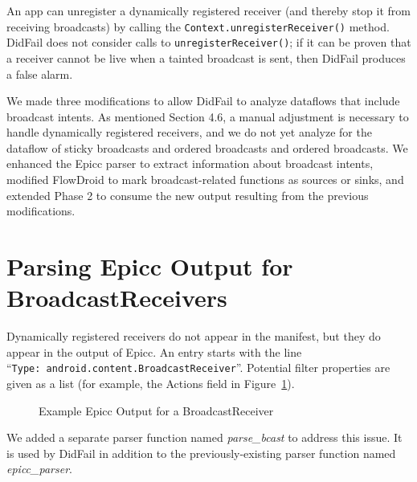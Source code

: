 An app can unregister a dynamically registered receiver (and thereby stop it from receiving broadcasts) by calling the \texttt{Context.unregisterReceiver()} method.  DidFail does not consider calls to \texttt{unregisterReceiver()}; if it can be proven that a receiver cannot be live when a tainted broadcast is sent, then DidFail produces a false alarm.

We made three modifications to allow DidFail to analyze dataflows that include broadcast intents. As mentioned Section 4.6, a manual adjustment is necessary to handle dynamically registered receivers, and we do not yet analyze for the dataflow of sticky broadcasts and ordered broadcasts and ordered broadcasts. We enhanced the Epicc parser to extract information about broadcast intents, modified FlowDroid to mark broadcast-related functions as sources or sinks, and extended Phase 2 to consume the new output resulting from the previous modifications.

\section{Parsing Epicc Output for BroadcastReceivers}
Dynamically registered receivers do not appear in the manifest, but they do appear in the output of Epicc.  An entry starts with the line ``\texttt{Type:\ android.content.BroadcastReceiver}''.  Potential filter properties are given as a list (for example, the Actions field in Figure~\ref{fig:bcast_epicc_output}).

\begin{figure}[!h]
\begin{framed}

\caption{Example Epicc Output for a BroadcastReceiver}
\label{fig:bcast_epicc_output}
\end{framed}
\end{figure}

We added a separate parser function named \emph{parse\_bcast} to address this issue. It is used by DidFail in addition to the previously-existing parser function named \emph{epicc\_parser}.

